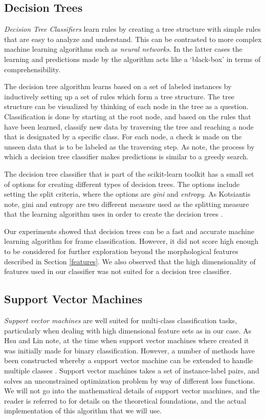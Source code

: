 \subsection{Decision Trees}

\textit{Decision Tree Classifiers} learn rules by creating a tree structure with simple rules that are easy to analyze and understand. This can be contrasted to more complex machine learning algorithms such as \textit{neural networks}. In the latter cases the learning and predictions made by the algorithm acts like a `black-box' in terms of comprehensibility.

The decision tree algorithm learns based on a set of labeled instances by inductively setting up a set of rules which form a tree structure. The tree structure can be visualized by thinking of each node in the tree as a question. Classification is done by starting at the root node, and based on the rules that have been learned, classify new data by traversing the tree and reaching a node that is designated by a specific class. For each node, a check is made on the unseen data that is to be labeled as the traversing step. As  note, the process by which a decision tree classifier makes predictions is similar to a greedy search.

The decision tree classifier that is part of the scikit-learn toolkit has a small set of options for creating different types of decision trees. The options include setting the split criteria, where the options are \textit{gini} and \textit{entropy}. As Kotsiantis note, gini and entropy are two different measure used as the splitting measure that the learning algorithm uses in order to create the decision trees \cite{Kotsiantis:13}.

Our experiments showed that decision trees can be a fast and accurate machine learning algorithm for frame classification. However, it did not score high enough to be considered for further exploration beyond the morphological features described in Section \ref{features}. We also observed that the high dimensionality of features used in our classifier was not suited for a decision tree classifier.

\subsection{Support Vector Machines}

\textit{Support vector machines} are well suited for multi-class classification tasks, particularly when dealing with high dimensional feature sets as in our case. As Hsu and Lin note, at the time when support vector machines where created it was initially made for binary classification. However, a number of methods have been constructed whereby a support vector machine can be extended to handle multiple classes \cite{Hsu:02}. Support vector machines takes a set of instance-label pairs, and solves an unconstrained optimization problem by way of different loss functions. We will not go into the mathematical details of support vector machines, and the reader is referred to \cite{liblinear} for details on the theoretical foundations, and the actual implementation of this algorithm that we will use.


